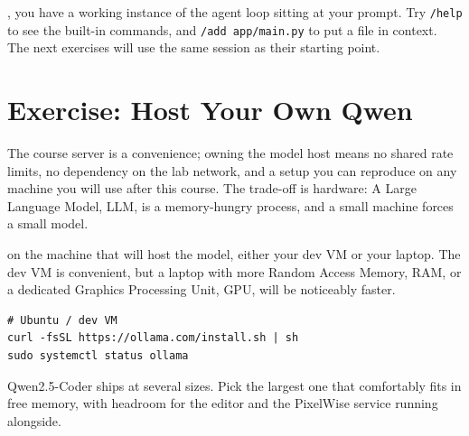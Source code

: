
, you have a working instance of the agent loop sitting at your prompt.
Try \texttt{/help} to see the built-in commands, and \texttt{/add app/main.py} to put a file in
context. The next exercises will use the same session as their starting point.

\newpage
\section{Exercise: Host Your Own Qwen}

 The course server is a convenience; owning the model host
means no shared rate limits, no dependency on the lab network, and a setup you can reproduce on
any machine you will use after this course. The trade-off is hardware: A Large Language Model,
LLM, is a memory-hungry process, and a small machine forces a small model.

 on the machine that will host the model, either your dev VM or your
laptop. The dev VM is convenient, but a laptop with more Random Access Memory, RAM, or a dedicated
Graphics Processing Unit, GPU, will be noticeably faster.

\begin{verbatim}
# Ubuntu / dev VM
curl -fsSL https://ollama.com/install.sh | sh
sudo systemctl status ollama
\end{verbatim}


 Qwen2.5-Coder ships at several sizes. Pick
the largest one that comfortably fits in free memory, with headroom for the editor and the
PixelWise service running alongside.


